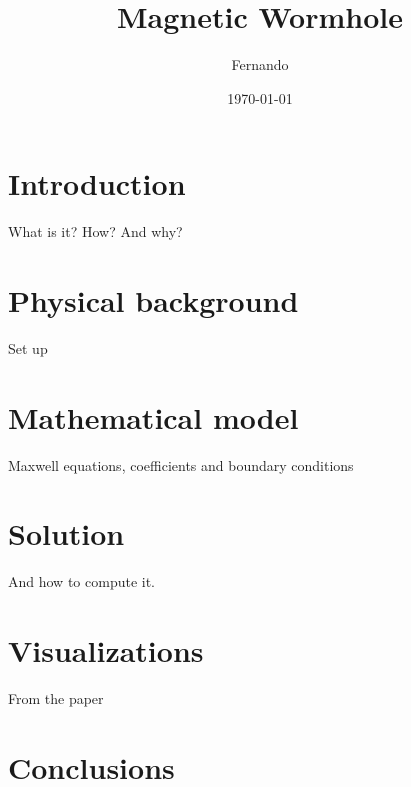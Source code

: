 \documentclass{article}
\begin{document}
\title{Magnetic Wormhole}
\author{Fernando}
\date{\today}
\maketitle

\section{Introduction}
What is it? How? And why?

\section{Physical background}
Set up

\section{Mathematical model}
Maxwell equations, coefficients and boundary conditions

\section{Solution}
And how to compute it.

\section{Visualizations}
From the paper

\section{Conclusions}
\end{document}
